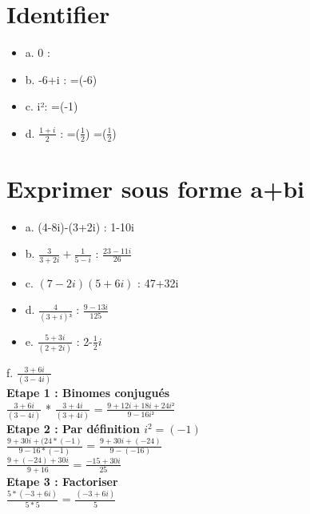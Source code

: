 \section{Identifier \R $  $ \I}

\begin{itemize}
\item {a. 0 :   }
\item {b. -6+i : \R=(-6) }
\item {c. i²: \R=(-1) }
\item {d. $\frac{1+i}{2}$ : \R=($\frac{1}{2}$) \I=($\frac{1}{2}$)}
\end{itemize}

\section{Exprimer sous forme a+bi}

\begin{itemize}
\item {a. (4-8i)-(3+2i) : 1-10i}
\item {b. $\frac{3}{3+2i} + \frac{1}{5-i}$ : $\frac{23-11i}{26}$}
\item {c. $(7-2i)(5+6i)$ : 47+32i}
\item {d. $\frac{4}{(3+i)³}$ : $\frac{9-13i}{125}$}
\item {e. $\frac{5+3i}{(2+2i)}$ : 2-$\frac{1}{2}i$}
\end{itemize}
\vspace{8mm} %

f. $\frac{3+6i}{(3-4i)} $ \\

\textbf{Etape 1 : Binomes conjugués} \\

$\frac{3+6i}{(3-4i)}$ * $\frac{3+4i}{(3+4i)}$ = $\frac{9+12i+18i+24i²}{9-16i²}$ \\

\textbf{Etape 2 : Par définition $i^{2} = (-1)$} \\

$\frac{9+30i+(24*(-1)}{9-16*(-1)}$  = $\frac{9+30i+(-24)}{9-(-16)}$ \\

$\frac{9+(-24)+30i}{9+16}$  = $\frac{-15+30i}{25}$ \\

\textbf{Etape 3 : Factoriser} \\

$\frac{5*(-3+6i)}{5*5}$ = $\frac{(-3+6i)}{5}$ \\

